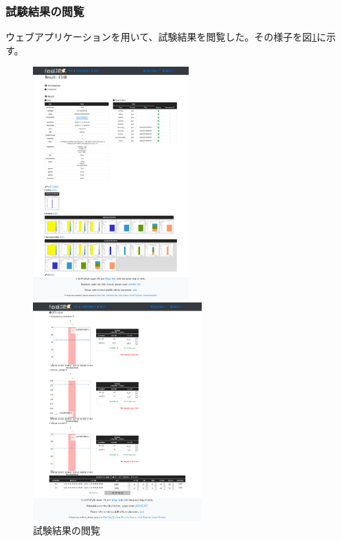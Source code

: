 \subsubsection{試験結果の閲覧}
ウェブアプリケーションを用いて、試験結果を閲覧した。その様子を図\ref{demo_view_result}に示す。
\begin{figure}[bpt]\centering
  \begin{minipage}{0.4\hsize}
    \begin{center}
    \includegraphics[width=60mm]{demo_view_scan_result}
    \end{center}
  \end{minipage}
  \begin{minipage}{0.4\hsize}
    \begin{center}
    \includegraphics[width=65mm]{demo_view_dcs}
    \end{center}
  \end{minipage}
  \caption[試験結果の閲覧]{試験結果の閲覧}
  \label{demo_view_result}
\end{figure}


